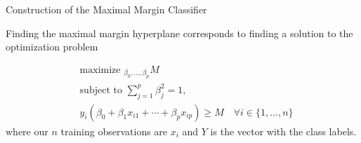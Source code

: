 \documentclass{beamer}
\begin{document}
\begin{frame}{Construction of the Maximal Margin Classifier}
	
	Finding the maximal margin hyperplane corresponds to finding a solution to the optimization problem
	
	\begin{equation*}
		\begin{split}
			&\textrm{maximize }_{\beta_0,\ldots, \beta_p} M \\
			&\textrm{subject to } \sum_{j=1}^p \beta_j^2 =1 , \\
			& y_i (\beta_0 + \beta_1 x_{i1}+ \cdots + \beta_p x_{ip} )\ge M \quad \forall i \in \{1,\ldots,n\}
		\end{split}
	\end{equation*}
where our $n$ training observations are $x_{i}$ and $Y$ is the vector with the class labels. 
\end{frame}
\end{document}
